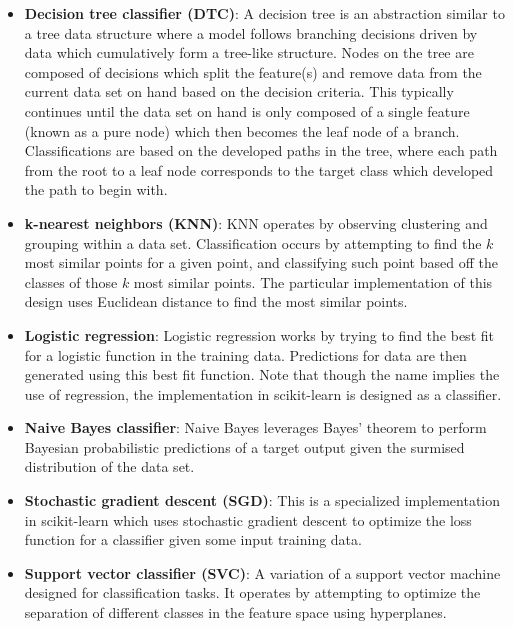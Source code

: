 \documentclass[10pt,sigconf,letterpaper,nonacm]{acmart}
\begin{document}
\begin{itemize}
  \item \textbf{Decision tree classifier (DTC)}: A decision tree is an abstraction similar to a tree data structure where a model follows branching decisions driven by data which cumulatively form a tree-like structure.
  Nodes on the tree are composed of decisions which split the feature(s) and remove data from the current data set on hand based on the decision criteria.
  This typically continues until the data set on hand is only composed of a single feature (known as a pure node) which then becomes the leaf node of a branch.
  Classifications are based on the developed paths in the tree, where each path from the root to a leaf node corresponds to the target class which developed the path to begin with.
  
  \item \textbf{k-nearest neighbors (KNN)}: KNN operates by observing clustering and grouping within a data set. Classification occurs by attempting to find the $k$ most similar points for a given point, and classifying such point based off the classes of those $k$ most similar points.
  The particular implementation of this design uses Euclidean distance to find the most similar points.
  
  \item \textbf{Logistic regression}: Logistic regression works by trying to find the best fit for a logistic function in the training data.
  Predictions for data are then generated using this best fit function.
  Note that though the name implies the use of regression, the implementation in scikit-learn is designed as a classifier.
  
  \item \textbf{Naive Bayes classifier}: Naive Bayes leverages Bayes' theorem to perform Bayesian probabilistic predictions of a target output given the surmised distribution of the data set.
  
  \item \textbf{Stochastic gradient descent (SGD)}: This is a specialized implementation in scikit-learn which uses stochastic gradient descent to optimize the loss function for a classifier given some input training data. 
  
  \item \textbf{Support vector classifier (SVC)}: A variation of a support vector machine designed for classification tasks. It operates by attempting to optimize the separation of different classes in the feature space using hyperplanes.
\end{itemize}
\end{document}
